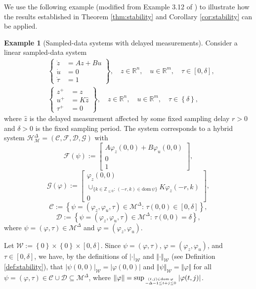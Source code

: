 \documentclass[journal,final,twocolumn]{IEEEtran}
\theoremstyle{definition}
\newtheorem{ex}{Example}
\begin{document}
We use the following example (modified from Example 3.12 of \cite{goebel2012hybrid}) to illustrate how the results established in Theorem \ref{thm:stability} and Corollary \ref{cor:stability} can be applied.

\begin{ex}[Sampled-data systems with delayed measurements]\label{ex1}
Consider a linear sampled-data system
\begin{align}
        &\left\{\begin{aligned}
        \dot{z} & =Az+Bu\\
        \dot{u} & =0\\
        \dot{\tau} & = 1
        \end{aligned}\right\},\quad z\in{\mathbb R}^n,\quad u\in{\mathbb R}^m,\quad \tau\in [0,\delta],\\
        &\left\{\begin{aligned}
        z^+ & =z\\
        u^+ & =K\hat{z}\\
        \tau^+ & = 0
        \end{aligned}\right\},\quad z\in{\mathbb R}^n,\quad u\in{\mathbb R}^m,\quad \tau\in {\left\{{\delta}\right\}},
\label{eq:sample}
\end{align}
where $\hat{z}$ is the delayed measurement affected by some fixed sampling delay $r>0$ and $\delta>0$ is the fixed sampling period. The system corresponds to a hybrid system ${\mathcal{H}_{\mathcal{M}}^{\Delta}}=({\mathcal{C}},{\mathcal{F}},{\mathcal{D}},{\mathcal{G}})$ with
$$
{\mathcal{F}}(\psi):=\begin{bmatrix}A{\varphi}_z(0,0)+B{\varphi}_u(0,0)\\
0\\
1
\end{bmatrix},
$$
$$
{\mathcal{G}}({\varphi}):=\begin{bmatrix}{\varphi}_z(0,0)\\
\cup_{\{k\in{\mathbb{Z}}_{\le 0}:\,(-r,k)\in{\text{dom}\,}\psi\}}K{\varphi}_z(-r,k)\\
0
\end{bmatrix},
$$
$$
{\mathcal{C}}:={\left\{{\psi=({\varphi}_z,{\varphi}_u,\tau)\in{\mathcal{M}^{\Delta}}:\,\tau(0,0)\in [0,\delta]}\right\}},
$$
$$
{\mathcal{D}}:={\left\{{\psi=({\varphi}_z,{\varphi}_u,\tau)\in{\mathcal{M}^{\Delta}}:\,\tau(0,0)=\delta}\right\}},
$$
where $\psi=({\varphi},\tau)\in{\mathcal{M}^{\Delta}}$ and ${\varphi}=({\varphi}_z,{\varphi}_u)$. 

Let ${\mathcal{W}}:={\left\{{0}\right\}}\times{\left\{{0}\right\}}\times[0,\delta]$. Since $\psi=({\varphi},\tau)$, ${\varphi}=({\varphi}_z,{\varphi}_u)$, and $\tau\in [0,\delta]$, we have, by the definitions of ${\left\vert{\cdot}\right\vert}_{\mathcal{W}}$ and ${\Vert{\cdot}\Vert}_{\mathcal{W}}$ (see Definition \ref{def:stability}), that ${\left\vert{\psi(0,0)}\right\vert}_{\mathcal{W}}={\left\vert{{\varphi}(0,0)}\right\vert}$ and ${\Vert{\psi}\Vert}_{\mathcal{W}}={\Vert{\varphi}\Vert}$ for all $\psi=({\varphi},\tau)\in{\mathcal{C}}\cup{\mathcal{D}}{\subseteq}{\mathcal{M}^{\Delta}}$, where ${\Vert{\varphi}\Vert}=\sup_{(t,j)\in{\text{dom}\,}{\varphi}\atop -\Delta-1\le t+j\le 0}{\left\vert{{\varphi}(t,j)}\right\vert}$.
\end{ex}
\end{document}
